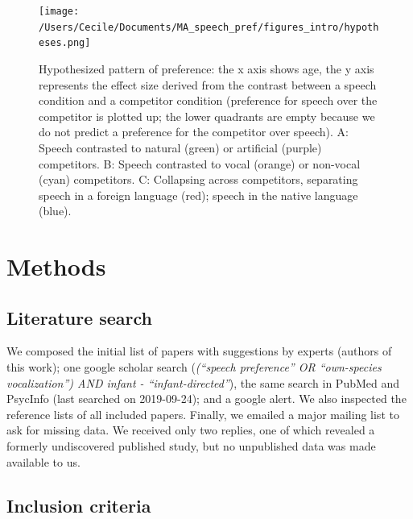 \documentclass[man]{apa6}
\begin{document}
\begin{figure}
\centering
\texttt{[image: /Users/Cecile/Documents/MA\_speech\_pref/figures\_intro/hypotheses.png]}
\caption{\label{fig:hyp}Hypothesized pattern of preference: the x axis shows
age, the y axis represents the effect size derived from the contrast
between a speech condition and a competitor condition (preference for
speech over the competitor is plotted up; the lower quadrants are empty
because we do not predict a preference for the competitor over speech).
A: Speech contrasted to natural (green) or artificial (purple)
competitors. B: Speech contrasted to vocal (orange) or non-vocal (cyan)
competitors. C: Collapsing across competitors, separating speech in a
foreign language (red); speech in the native language (blue).}
\end{figure}

\section{Methods}\label{methods}

\subsection{Literature search}\label{literature-search}

We composed the initial list of papers with suggestions by experts
(authors of this work); one google scholar search
(\emph{(\enquote{speech preference} OR \enquote{own-species
vocalization}) AND infant - \enquote{infant-directed}}), the same search
in PubMed and PsycInfo (last searched on 2019-09-24); and a google
alert. We also inspected the reference lists of all included papers.
Finally, we emailed a major mailing list to ask for missing data. We
received only two replies, one of which revealed a formerly undiscovered
published study, but no unpublished data was made available to us.

\subsection{Inclusion criteria}\label{inclusion-criteria}
\end{document}
